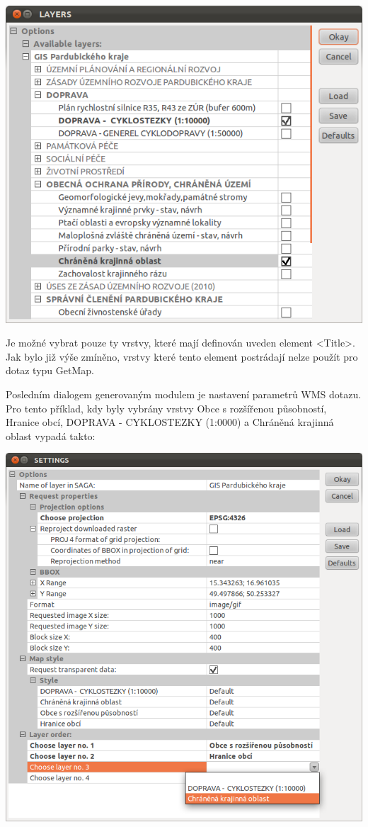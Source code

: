 \documentclass[a4paper,12pt]{article}
\begin{document}
 \includegraphics[scale=0.6]{figures/SAGA_okno2.png}
 
Je možné vybrat pouze ty vrstvy, které mají definován uveden element <Title>. Jak bylo již výše zmíněno, vrstvy které tento element postrádají nelze použít pro dotaz typu GetMap. 
 
 
 Posledním dialogem generovaným modulem je nastavení parametrů WMS dotazu. 
Pro tento příklad, kdy byly vybrány vrstvy Obce s rozšířenou působností, Hranice obcí, DOPRAVA - CYKLOSTEZKY (1:0000) a Chráněná krajinná oblast vypadá takto:
 
  \includegraphics[scale=0.6]{figures/SAGA_okno3.png}
\end{document}
